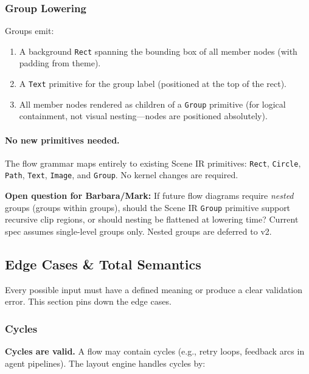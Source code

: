\subsubsection{Group Lowering}

Groups emit:
\begin{enumerate}
  \item A background \texttt{Rect} spanning the bounding box of all member nodes (with padding from theme).
  \item A \texttt{Text} primitive for the group label (positioned at the top of the rect).
  \item All member nodes rendered as children of a \texttt{Group} primitive (for logical containment, not visual nesting---nodes are positioned absolutely).
\end{enumerate}

\paragraph{No new primitives needed.}
The flow grammar maps entirely to existing Scene IR primitives: \texttt{Rect}, \texttt{Circle}, \texttt{Path}, \texttt{Text}, \texttt{Image}, and \texttt{Group}. No kernel changes are required.

\textbf{Open question for Barbara/Mark:} If future flow diagrams require \emph{nested} groups (groups within groups), should the Scene IR \texttt{Group} primitive support recursive clip regions, or should nesting be flattened at lowering time? Current spec assumes single-level groups only. Nested groups are deferred to v2.

\subsection{Edge Cases \& Total Semantics}
\label{sec:flow-edge-cases}

Every possible input must have a defined meaning or produce a clear validation error. This section pins down the edge cases.

\subsubsection{Cycles}

\textbf{Cycles are valid.} A flow may contain cycles (e.g., retry loops, feedback arcs in agent pipelines). The layout engine handles cycles by:

